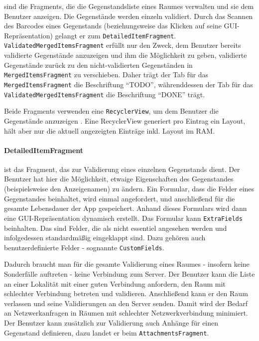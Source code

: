 sind die Fragments, die die Gegenstandsliste eines Raumes verwalten und
sie dem Benutzer anzeigen. Die Gegenstände werden einzeln validiert.
Durch das Scannen des Barcodes eines Gegenstands (beziehungsweise das
Klicken auf seine GUI-Repräsentation) gelangt er zum
\texttt{DetailedItemFragment}. \texttt{ValidatedMergedItemsFragment}
erfüllt nur den Zweck, dem Benutzer bereits validierte Gegenstände
anzuzeigen und ihm die Möglichkeit zu geben, validierte Gegenstände
zurück zu den nicht-validierten Gegenständen in
\texttt{MergedItemsFragment} zu verschieben. Daher trägt der Tab für das
\texttt{MergedItemsFragment} die Beschriftung ``TODO'', währenddessen
der Tab für das \texttt{ValidatedMergedItemsFragment} die Beschriftung
``DONE'' trägt.

Beide Fragments verwenden eine \texttt{RecyclerView}, um dem Benutzer
die Gegenstände anzuzeigen \cite{recyclerview}. Eine RecyclerView
generiert pro Eintrag ein Layout, hält aber nur die aktuell angezeigten
Einträge inkl. Layout im RAM.

\hypertarget{detaileditemfragment}{%
\paragraph{DetailedItemFragment}\label{detaileditemfragment}}

ist das Fragment, das zur Validierung eines einzelnen Gegenstands dient.
Der Benutzer hat hier die Möglichkeit, etwaige Eigenschaften des
Gegenstandes (beispielsweise den Anzeigenamen) zu ändern. Ein Formular,
dass die Felder eines Gegenstandes beinhaltet, wird einmal angefordert,
und anschließend für die gesamte Lebensdauer der App gespeichert. Anhand
dieses Formulars wird dann eine GUI-Repräsentation dynamisch erstellt.
Das Formular kann \texttt{ExtraFields} beinhalten. Das sind Felder, die
als nicht essentiel angesehen werden und infolgedessen standardmäßig
eingeklappt sind. Dazu gehören auch benutzerdefinierte Felder -
sognannte \texttt{CustomFields}.

Dadurch braucht man für die gesamte Validierung eines Raumes - insofern
keine Sonderfälle auftreten - keine Verbindung zum Server. Der Benutzer
kann die Liste an einer Lokalität mit einer guten Verbindung anfordern,
den Raum mit schlechter Verbindung betreten und validieren. Anschließend
kann er den Raum verlassen und seine Validierungen an den Server senden.
Damit wird der Bedarf an Netzwerkanfragen in Räumen mit schlechter
Netzwerkverbindung minimiert. Der Benutzer kann zusätzlich zur
Validierung auch Anhänge für einen Gegenstand definieren, dazu landet er
beim \texttt{AttachmentsFragment}.

